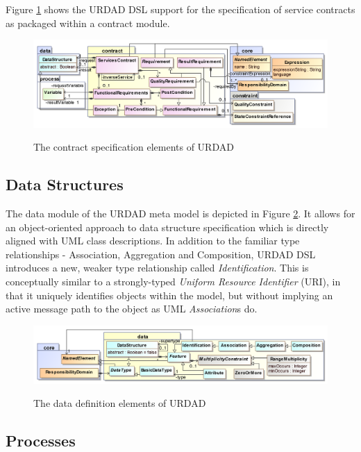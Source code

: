 Figure \ref{fig:contractModule} shows the URDAD DSL support for the specification of service contracts as packaged within a contract module.

\begin{figure}[thbp]
  \centering
  \includegraphics{contract}\\   
  \caption{The contract specification elements of URDAD}
  \label{fig:contractModule}
\end{figure}


\subsection{Data Structures}

The data module of the URDAD meta model is depicted in Figure \ref{fig:dataStructureModule}. It allows for an object-oriented approach to data structure specification which is directly aligned with UML class descriptions. In addition to the familiar type relationships - Association, Aggregation and Composition, URDAD DSL introduces a new, weaker type relationship called \emph{Identification}. This is conceptually similar to a strongly-typed \emph{Uniform Resource Identifier} (URI), in that it uniquely identifies objects within the model, but without implying an active message path to the object as UML \emph{Association}s do.
 
\begin{figure}[thbp]
  \centering
  \includegraphics{data}\\   
  \caption{The data definition elements of URDAD}
  \label{fig:dataStructureModule}
\end{figure}

\subsection{Processes}

